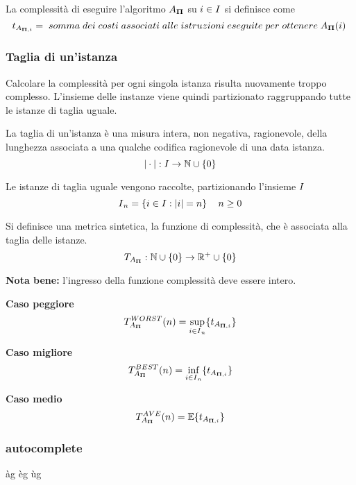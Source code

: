 La complessità di eseguire l'algoritmo $A_{\bm{\Pi}{}}$ su $i \in I{}$ si definisce come
$$t_{A_{\bm{\Pi}{},i}}=\;somma\;dei\;costi\;associati\;alle\;istruzioni\;eseguite\;per\;ottenere\;A_{\bm{\Pi}{}}(i)\;$$

\subsubsection{Taglia di un'istanza}
Calcolare la complessità per ogni singola istanza risulta nuovamente troppo complesso. L'insieme delle instanze viene quindi partizionato raggruppando tutte le istanze di taglia uguale.

\begin{definition}\label{def:taglia}
    La taglia di un'istanza è una misura intera, non negativa, ragionevole, della lunghezza associata a una qualche codifica ragionevole di una data istanza.\\
    $$|\cdot|:I{}\to \mathbb{N} \cup \{0\}$$
\end{definition}

Le istanze di taglia uguale vengono raccolte, partizionando l'insieme $I{}$
$$ I{}_{n} = \left\{ i \in I{} : |i|=n \right\} \quad n \geq 0$$ 

Si definisce una metrica sintetica, la funzione di complessità, che è associata alla taglia delle istanze.
$$ T_{A_{\bm{\Pi}{}}} : \mathbb{N} \cup \{0\} \to \mathbb{R}^{+} \cup \{0\}$$

\textbf{Nota bene:} l'ingresso della funzione complessità deve essere intero.

\begin{description}
    \item{\textbf{Caso peggiore}} $$ T_{A_{\bm{\Pi}{}}}^{WORST} (n) = \sup_{i \in I{}_{n}} \{t_{A_{\bm{\Pi}{},i}} \} $$
    \item{\textbf{Caso migliore}} $$ T_{A_{\bm{\Pi}{}}}^{BEST} (n) = \inf_{i \in I{}_{n}} \{t_{A_{\bm{\Pi}{},i}} \} $$
    \item{\textbf{Caso medio}} $$ T_{A_{\bm{\Pi}{}}}^{AVE} (n) = \mathbb{E} \{t_{A_{\bm{\Pi}{},i}} \} $$
\end{description}
\subsubsection{autocomplete}

àg
èg
ùg
